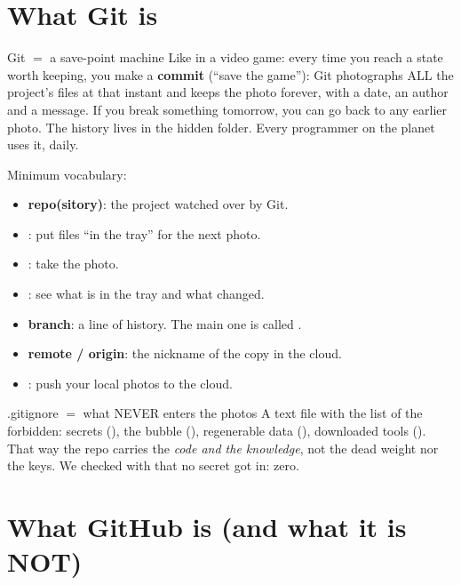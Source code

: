 \documentclass[11pt,a4paper]{article}
\begin{document}

\section{What Git is}

\begin{concepto}{Git $=$ a save-point machine}
Like in a video game: every time you reach a state worth keeping, you make a \textbf{commit}
(``save the game''): Git photographs ALL the project's files at that instant and keeps the
photo forever, with a date, an author and a message. If you break something tomorrow, you can
go back to any earlier photo. The history lives in the hidden  folder. Every
programmer on the planet uses it, daily.
\end{concepto}

Minimum vocabulary:
\begin{itemize}
  \item \textbf{repo(sitory)}: the project watched over by Git.
  \item {}: put files ``in the tray'' for the next photo.
  \item {}: take the photo.
  \item {}: see what is in the tray and what changed.
  \item \textbf{branch}: a line of history. The main one is called .
  \item \textbf{remote / origin}: the nickname of the copy in the cloud.
  \item {}: push your local photos to the cloud.
\end{itemize}

\begin{concepto}{.gitignore $=$ what NEVER enters the photos}
A text file with the list of the forbidden: secrets (), the bubble
(), regenerable data (), downloaded tools ().
That way the repo carries the \emph{code and the knowledge}, not the dead weight nor the keys.
We checked with  that no secret got in: zero.
\end{concepto}

\section{What GitHub is (and what it is NOT)}
\end{document}
